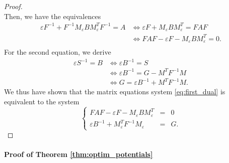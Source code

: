 \documentclass[]{article}
\numberwithin{equation}{section}
\theoremstyle{plain}
\begin{document}
{\begin{proof}
\begin{equation}
	\end{equation}
	Then, we have the equivalences
	\begin{align*}
		\varepsilon F^{-1}+ F^{-1} M_{\varepsilon}B M_{\varepsilon}^TF^{-1}  =  A & \Leftrightarrow \varepsilon F + M_{\varepsilon}BM_{\varepsilon}^T  = FAF \\
		& \Leftrightarrow  FAF - \varepsilon F  -M_{\varepsilon}BM_{\varepsilon}^T= 0.\\
	\end{align*}
	For the second equation, we derive 
	\begin{align*}
		\varepsilon S^{-1}  =  B & \Leftrightarrow \varepsilon B^{-1} = S \\
		& \Leftrightarrow  \varepsilon B^{-1} = G -M^TF^{-1}M\\
		& \Leftrightarrow   G =  \varepsilon B^{-1} + M^TF^{-1}M.
	\end{align*}
	We thus have shown that the matrix equations system \eqref{eq:first_dual} is equivalent to the system
	\begin{equation*}
		\left\{ 
		\begin{array}{ccc}
			FAF - \varepsilon F - M_{\varepsilon}BM_{\varepsilon}^T& = & 0 \\
			\varepsilon B^{-1} + M_\varepsilon^T F^{-1}M_{\varepsilon}& = & G.
		\end{array}
		\right.
	\end{equation*}
\end{proof}

\paragraph{Proof of Theorem \ref{thm:optim_potentials}}


}
\end{document}
